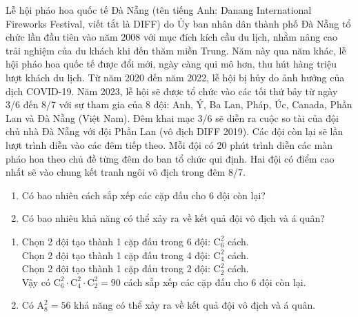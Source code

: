 \begin{bt}%
Lễ hội pháo hoa quốc tế Đà Nẵng (tên tiếng Anh: Danang International Fireworks Festival, viết tắt là DIFF) do Ủy ban nhân dân thành phố Đà Nẵng tổ chức lần đầu tiên vào năm 2008 với mục đích kích cầu du lịch, nhằm nâng cao trải nghiệm của du khách khi đến thăm miền Trung. Năm này qua năm khác, lễ hội pháo hoa quốc tế được đổi mới, ngày càng qui mô hơn, thu hút hàng triệu lượt khách du lịch. Từ năm 2020 đến năm 2022, lễ hội bị hủy do ảnh hưởng của dịch COVID-19. Năm 2023, lễ hội sẽ được tổ chức vào các tối thứ bảy từ ngày 3/6 đến 8/7 với sự tham gia của 8 đội: Anh, Ý, Ba Lan, Pháp, Úc, Canada, Phần Lan và Đà Nẵng (Việt Nam). Đêm khai mạc 3/6 sẽ diễn ra cuộc so tài của đội chủ nhà Đà Nẵng với đội Phần Lan (vô địch DIFF 2019). Các đội còn lại sẽ lần lượt trình diễn vào các đêm tiếp theo. Mỗi đội có 20 phút trình diễn các màn pháo hoa theo chủ đề từng đêm do ban tổ chức qui định. Hai đội có điểm cao nhất sẽ vào chung kết tranh ngôi vô địch trong đêm 8/7.
\begin{enumerate}
	\item Có bao nhiêu cách sắp xếp các cặp đấu cho 6 đội còn lại?
	\item Có bao nhiêu khả năng có thể xảy ra về kết quả đội vô địch và á quân?
\end{enumerate}
	\loigiai
	{
	\begin{enumerate}
		\item Chọn 2 đội tạo thành 1 cặp đấu trong 6 đội: $\mathrm{C}^2_6$ cách.\\
		Chọn 2 đội tạo thành 1 cặp đấu trong 4 đội: $\mathrm{C}^2_4$ cách.\\
		Chọn 2 đội tạo thành 1 cặp đấu trong 2 đội: $\mathrm{C}^2_2$ cách.\\
		Vậy có $\mathrm{C}^2_6 \cdot \mathrm{C}^2_4 \cdot \mathrm{C}^2_2=90$ cách sắp xếp các cặp đấu cho 6 đội còn lại.
		\item Có $\mathrm{A}_8^2=56$ khả năng có thể xảy ra về kết quả đội vô địch và á quân.
	\end{enumerate}	
	}
\end{bt}

